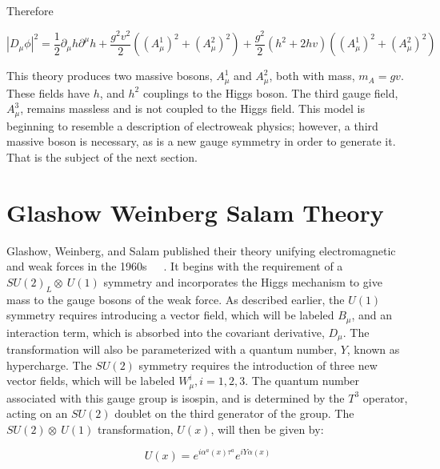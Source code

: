 \noindent Therefore

\begin{equation}\label{eq:non_abelian_higgs_mechanism_covariant_derivative_sq}
|D_{\mu}\phi|^{2} = \frac{1}{2}\partial_{\mu}h\partial^{\mu}h +
\frac{g^{2}v^{2}}{2}\left( (A_{\mu}^{1})^{2} + (A_{\mu}^{2})^{2} \right) +
\frac{g^{2}}{2}(h^{2}+2hv)\left( (A_{\mu}^{1})^{2} + (A_{\mu}^{2})^{2} \right)
\end{equation}

\par This theory produces two massive bosons, $A_{\mu}^{1}$ and
$A_{\mu}^{2}$, both with mass, $m_{A} = gv$.  These fields have $h$,
and $h^2$ couplings to the Higgs boson.  The third gauge field,
$A_{\mu}^{3}$, remains massless and is not coupled to the Higgs field.
This model is beginning to resemble a description of electroweak
physics; however, a third massive boson is necessary, as is a new
gauge symmetry in order to generate it.  That is the subject of the
next section.  

\section{Glashow Weinberg Salam Theory}
\label{ewk_overview}

\par Glashow, Weinberg, and Salam published their theory unifying
electromagnetic and weak forces in the
1960s~\cite{th:Weinberg_ModelOfLeptons}~\cite{th:Glashow_PartialSymmetries}~\cite{th:Salam_EWKInteractions}.
It begins with the requirement of a $SU(2)_{L}\otimes~U(1)$
symmetry and incorporates the Higgs mechanism to give mass to the gauge bosons
of the weak force.  As described earlier, the $U(1)$ symmetry requires
introducing a vector field, which will be labeled $B_{\mu}$, and an interaction term, which
is absorbed into the covariant derivative, $D_{\mu}$.  The
transformation will also be parameterized with a quantum
number, $Y$, known as hypercharge.  The $SU(2)$
symmetry requires the introduction of three new 
vector fields, which will be labeled $W_{\mu}^{i}, i = 1, 2, 3$.  The
quantum number associated with this gauge group is isospin,
and is determined by the $T^{3}$ operator, acting on an $SU(2)$
doublet on the third generator of the group. The $SU(2)\otimes~U(1)$
transformation, $U(x)$, will then be given by:   

\begin{equation}\label{eq:ewk_su2_su1_transformation}
U(x) = e^{i\alpha^{a}(x)\tau^{a}}e^{iY\alpha(x)}
\end{equation}

